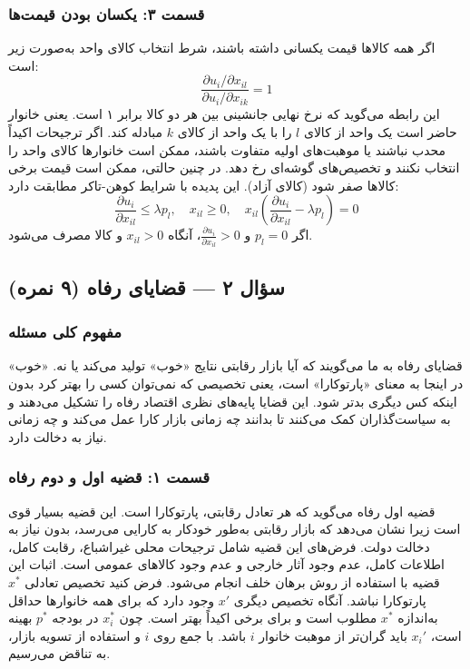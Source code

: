 \documentclass[12pt,a4paper]{article}
\begin{document}
\subsubsection*{قسمت ۳: یکسان بودن قیمت‌ها}

اگر همه کالاها قیمت یکسانی داشته باشند، شرط انتخاب کالای واحد به‌صورت زیر است:
\[
	\frac{\partial u_i / \partial x_{il}}{\partial u_i / \partial x_{ik}} = 1
\]
این رابطه می‌گوید که نرخ نهایی جانشینی بین هر دو کالا برابر ۱ است. یعنی خانوار حاضر است یک واحد از کالای $l$ را با یک واحد از کالای $k$ مبادله کند. اگر ترجیحات اکیداً محدب نباشند یا موهبت‌های اولیه متفاوت باشند، ممکن است خانوارها کالای واحد را انتخاب نکنند و تخصیص‌های گوشه‌ای رخ دهد. در چنین حالتی، ممکن است قیمت برخی کالاها صفر شود (کالای آزاد). این پدیده با شرایط کوهن-تاکر مطابقت دارد:
\[
	\frac{\partial u_i}{\partial x_{il}} \leq \lambda p_l, \quad x_{il} \geq 0, \quad x_{il} \left( \frac{\partial u_i}{\partial x_{il}} - \lambda p_l \right) = 0
\]
اگر $p_l = 0$ و $\frac{\partial u_i}{\partial x_{il}} > 0$، آنگاه $x_{il} > 0$ و کالا مصرف می‌شود.

\subsection{سؤال ۲ — قضایای رفاه (۹ نمره)}

\subsubsection*{مفهوم کلی مسئله}

قضایای رفاه به ما می‌گویند که آیا بازار رقابتی نتایج «خوب» تولید می‌کند یا نه. «خوب» در اینجا به معنای «پارتوکارا» است، یعنی تخصیصی که نمی‌توان کسی را بهتر کرد بدون اینکه کس دیگری بدتر شود. این قضایا پایه‌های نظری اقتصاد رفاه را تشکیل می‌دهند و به سیاست‌گذاران کمک می‌کنند تا بدانند چه زمانی بازار کارا عمل می‌کند و چه زمانی نیاز به دخالت دارد.

\subsubsection*{قسمت ۱: قضیه اول و دوم رفاه}

قضیه اول رفاه می‌گوید که هر تعادل رقابتی، پارتوکارا است. این قضیه بسیار قوی است زیرا نشان می‌دهد که بازار رقابتی به‌طور خودکار به کارایی می‌رسد، بدون نیاز به دخالت دولت. فرض‌های این قضیه شامل ترجیحات محلی غیراشباع، رقابت کامل، اطلاعات کامل، عدم وجود آثار خارجی و عدم وجود کالاهای عمومی است. اثبات این قضیه با استفاده از روش برهان خلف انجام می‌شود. فرض کنید تخصیص تعادلی $x^*$ پارتوکارا نباشد. آنگاه تخصیص دیگری $x'$ وجود دارد که برای همه خانوارها حداقل به‌اندازه $x^*$ مطلوب است و برای برخی اکیداً بهتر است. چون $x_i^*$ در بودجه $p^*$ بهینه است، $x_i'$ باید گران‌تر از موهبت خانوار $i$ باشد. با جمع روی $i$ و استفاده از تسویه بازار، به تناقض می‌رسیم.
\end{document}
